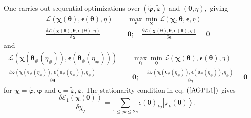 \documentclass[aps,preprint]{revtex4}%
\begin{document}
One carries out sequential optimizations over $\left(  \boldsymbol{\tilde
{\varphi},\tilde{\varepsilon}}\right)  $ and $\left(  \boldsymbol{\theta,}%
\eta\right)  ,$ giving
\begin{align}
\mathcal{L}\left(  \boldsymbol{\chi\left(  \boldsymbol{\theta}\right)
,\epsilon\left(  \boldsymbol{\theta}\right)  ,}\eta\right)   &  =\max
_{\boldsymbol{\epsilon}}\min_{\boldsymbol{\chi}}\mathcal{L}\left(
\boldsymbol{\chi,\theta},\boldsymbol{\epsilon,}\eta\right) \nonumber\\
\frac{\delta\mathcal{L}\left(  \boldsymbol{\chi\left(  \boldsymbol{\theta
}\right)  ,\boldsymbol{\theta},\epsilon\left(  \boldsymbol{\theta}\right)
,}\eta\right)  }{\delta\boldsymbol{\chi}}  &  =\boldsymbol{0};\quad
\frac{\partial\mathcal{L}\left(  \boldsymbol{\chi\left(  \boldsymbol{\theta
}\right)  ,\boldsymbol{\theta},\epsilon\left(  \boldsymbol{\theta}\right)
,}\eta\right)  }{\partial\boldsymbol{\epsilon}}=\boldsymbol{0} \label{AGPL1}%
\end{align}
and
\begin{align}
\mathcal{L}\left(  \boldsymbol{\chi}\left(  \boldsymbol{\theta}_{\#}\left(
\eta_{\#}\right)  \right)  \boldsymbol{,\epsilon}\left(  \boldsymbol{\theta
}_{\#}\left(  \eta_{\#}\right)  \right)  \right)   &  =\max_{\boldsymbol{\eta
}}\min_{\boldsymbol{\theta}}\mathcal{L}\left(  \boldsymbol{\chi\left(
\boldsymbol{\theta}\right)  ,\epsilon\left(  \boldsymbol{\theta}\right)
,}\eta\right) \nonumber\\
\frac{\partial\mathcal{L}\left(  \boldsymbol{\chi}\left(  \boldsymbol{\theta
}_{\#}\left(  \eta_{\#}\right)  \right)  ,\boldsymbol{\epsilon}\left(
\boldsymbol{\theta}_{\#}\left(  \eta_{\#}\right)  \right)  \boldsymbol{,}%
\eta_{\#}\right)  }{\partial\boldsymbol{\theta}}  &  =\boldsymbol{0}%
;\quad\frac{\partial\mathcal{L}\left(  \boldsymbol{\chi}\left(
\boldsymbol{\theta}_{\#}\left(  \eta_{\#}\right)  \right)
,\boldsymbol{\epsilon}\left(  \boldsymbol{\theta}_{\#}\left(  \eta
_{\#}\right)  \right)  \boldsymbol{,}\eta_{\#}\right)  }{\partial\eta
}=\boldsymbol{0} \label{AGPL2}%
\end{align}
for $\boldsymbol{\chi=\tilde{\varphi},\varphi}$ and $\boldsymbol{\epsilon
=\tilde{\varepsilon},\varepsilon.}$ The stationarity condition in eq. $\left(
\ref{AGPL1}\right)  $ gives
\begin{equation}
\frac{\delta\mathcal{E}_{1}\left(  \boldsymbol{\chi\left(  \boldsymbol{\theta
}\right)  }\right)  }{\delta\chi_{j}}=\sum_{1\leq jk\leq2s}\epsilon
\boldsymbol{\left(  \boldsymbol{\theta}\right)  }_{kj}\left\vert \varphi
_{k}\boldsymbol{\left(  \boldsymbol{\theta}\right)  }\right\rangle ,
\end{equation}
\end{document}
